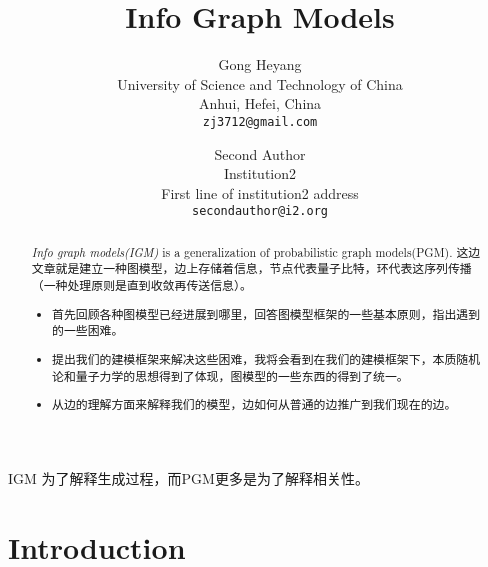 \documentclass[10pt,onecolumn,letterpaper]{article}
\begin{document}
\begin{CJK*}{UTF8}{gbsn}

\title{Info Graph Models}

\author{Gong Heyang\\
University of Science and Technology of China\\
Anhui, Hefei, China\\
{\tt\small zj3712@gmail.com}
\and
Second Author\\
Institution2\\
First line of institution2 address\\
{\tt\small secondauthor@i2.org}
}

\maketitle

\begin{abstract}
    \emph{Info graph models(IGM)} is a generalization of probabilistic graph models(PGM). 这边文章就是建立一种图模型，边上存储着信息，节点代表量子比特，环代表这序列传播（一种处理原则是直到收敛再传送信息）。 
    \begin{itemize}
        \item 首先回顾各种图模型已经进展到哪里，回答图模型框架的一些基本原则，指出遇到的一些困难。 
        \item 提出我们的建模框架来解决这些困难，我将会看到在我们的建模框架下，本质随机论和量子力学的思想得到了体现，图模型的一些东西的得到了统一。
        \item 从边的理解方面来解释我们的模型，边如何从普通的边推广到我们现在的边。
    \end{itemize}
\end{abstract}

IGM 为了解释生成过程，而PGM更多是为了解释相关性。

\tableofcontents

\section{Introduction}




\end{CJK*}
\end{document}
